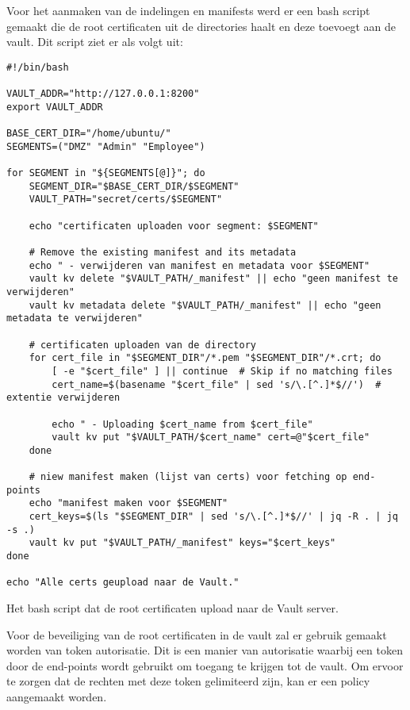 Voor het aanmaken van de indelingen en manifests werd er een bash script gemaakt die de root certificaten uit de directories haalt en deze toevoegt aan de vault. Dit script ziet er als volgt uit:
\begin{listing}[H]
\begin{verbatim}
#!/bin/bash

VAULT_ADDR="http://127.0.0.1:8200"
export VAULT_ADDR

BASE_CERT_DIR="/home/ubuntu/"
SEGMENTS=("DMZ" "Admin" "Employee")

for SEGMENT in "${SEGMENTS[@]}"; do
    SEGMENT_DIR="$BASE_CERT_DIR/$SEGMENT"
    VAULT_PATH="secret/certs/$SEGMENT"

    echo "certificaten uploaden voor segment: $SEGMENT"

    # Remove the existing manifest and its metadata
    echo " - verwijderen van manifest en metadata voor $SEGMENT"
    vault kv delete "$VAULT_PATH/_manifest" || echo "geen manifest te verwijderen"
    vault kv metadata delete "$VAULT_PATH/_manifest" || echo "geen metadata te verwijderen"

    # certificaten uploaden van de directory
    for cert_file in "$SEGMENT_DIR"/*.pem "$SEGMENT_DIR"/*.crt; do
        [ -e "$cert_file" ] || continue  # Skip if no matching files
        cert_name=$(basename "$cert_file" | sed 's/\.[^.]*$//')  # extentie verwijderen

        echo " - Uploading $cert_name from $cert_file"
        vault kv put "$VAULT_PATH/$cert_name" cert=@"$cert_file"
    done

    # niew manifest maken (lijst van certs) voor fetching op end-points
    echo "manifest maken voor $SEGMENT"
    cert_keys=$(ls "$SEGMENT_DIR" | sed 's/\.[^.]*$//' | jq -R . | jq -s .)
    vault kv put "$VAULT_PATH/_manifest" keys="$cert_keys"
done

echo "Alle certs geupload naar de Vault."
\end{verbatim}
\caption[Bash script voor het uploaden van certificaten naar de Vault]{Het bash script dat de root certificaten upload naar de Vault server.}
\end{listing}

Voor de beveiliging van de root certificaten in de vault zal er gebruik gemaakt worden van token autorisatie. Dit is een manier van autorisatie waarbij een token door de end-points wordt gebruikt om toegang te krijgen tot de vault.
Om ervoor te zorgen dat de rechten met deze token gelimiteerd zijn, kan er een policy aangemaakt worden. \\

